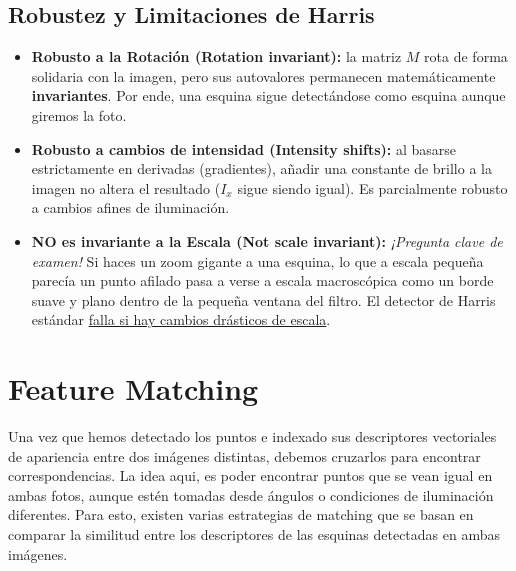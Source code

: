 \subsection{Robustez y Limitaciones de Harris}
\begin{itemize}
    \item \textbf{Robusto a la Rotación (Rotation invariant):} la matriz $M$ rota de forma solidaria con la imagen, pero sus autovalores permanecen matemáticamente \textbf{invariantes}. Por ende, una esquina sigue detectándose como esquina aunque giremos la foto.
    \item \textbf{Robusto a cambios de intensidad (Intensity shifts):} al basarse estrictamente en derivadas (gradientes), añadir una constante de brillo a la imagen no altera el resultado ($I_x$ sigue siendo igual). Es parcialmente robusto a cambios afines de iluminación.
    \item \textbf{NO es invariante a la Escala (Not scale invariant):} \textit{¡Pregunta clave de examen!} Si haces un zoom gigante a una esquina, lo que a escala pequeña parecía un punto afilado pasa a verse a escala macroscópica como un borde suave y plano dentro de la pequeña ventana del filtro. El detector de Harris estándar \underline{falla si hay cambios drásticos de escala}.
\end{itemize}

\section{Feature Matching}
\noindent
Una vez que hemos detectado los puntos e indexado sus descriptores vectoriales de apariencia entre dos imágenes distintas, debemos cruzarlos para encontrar correspondencias. La idea aqui, es poder encontrar puntos que se vean igual en ambas fotos, aunque estén tomadas desde ángulos o condiciones de iluminación diferentes. Para esto, existen varias estrategias de matching que se basan en comparar la similitud entre los descriptores de las esquinas detectadas en ambas imágenes.


